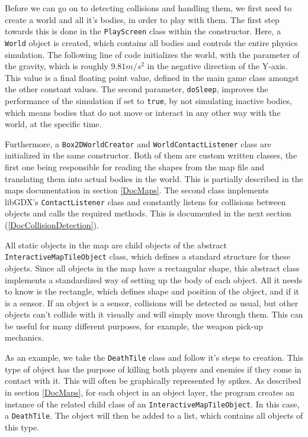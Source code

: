 \documentclass[12p]{article}
\begin{document}
Before we can go on to detecting collisions and handling them, we first need to create a world and all it's bodies, in order to play with them. The first step towards this is done in the \texttt{PlayScreen} class within the constructor. Here, a \texttt{World} object is created, which contains all bodies and controls the entire physics simulation. The following line of code initializes the world, with the parameter of the gravity, which is roughly $9.81m/s^2$ in the negative direction of the Y-axis. This value is a final floating point value, defined in the main game class amongst the other constant values. The second parameter, \texttt{doSleep}, improves the performance of the simulation if set to \texttt{true}, by not simulating inactive bodies, which means bodies that do not move or interact in any other way with the world, at the specific time.


Furthermore, a \texttt{Box2DWorldCreator} and \texttt{WorldContactListener} class are initialized in the same constructor. Both of them are custom written classes, the first one being responsible for reading the shapes from the map file and translating them into actual bodies in the world. This is partially described in the maps documentation in section \ref{DocMaps}. The second class implements libGDX's \texttt{ContactListener} class and constantly listens for collisions between objects and calls the required methods. This is documented in the next section (\ref{DocCollisionDetection}).

All static objects in the map are child objects of the abstract \texttt{InteractiveMapTileObject} class, which defines a standard structure for these objects. Since all objects in the map have a rectangular shape, this abstract class implements a standardized way of setting up the body of each object. All it needs to know is the rectangle, which defines shape and position of the object, and if it is a sensor. If an object is a sensor, collisions will be detected as usual, but other objects can't collide with it visually and will simply move through them. This can be useful for many different purposes, for example, the weapon pick-up mechanics.

As an example, we take the \texttt{DeathTile} class and follow it's steps to creation. This type of object has the purpose of killing both players and enemies if they come in contact with it. This will often be graphically represented by spikes. As described in section \ref{DocMaps}, for each object in an object layer, the program creates an instance of the related child class of an \texttt{InteractiveMapTileObject}. In this case, a \texttt{DeathTile}. The object will then be added to a list, which contains all objects of this type.
\end{document}
